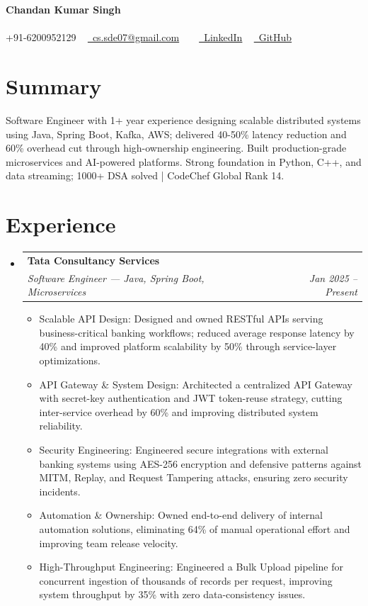 \documentclass[10pt, letterpaper]{article}
\makeatletter
\newcommand{\resumeItem}[1]{
  \item\small{
    {#1 \vspace{-2pt}}
  }
}
\newcommand{\resumeSubheading}[4]{
  \vspace{-2pt}\item
    \begin{tabular*}{1.0\textwidth}[t]{l@{\extracolsep{\fill}}r}
      \textbf{#1} & \textbf{\small #2} \\
      \textit{\small#3} & \textit{\small #4} \\
    \end{tabular*}\vspace{-7pt}
}
\newcommand{\resumeSubHeadingListStart}{\begin{itemize}[leftmargin=0.0in, label={}]}
\newcommand{\resumeSubHeadingListEnd}{\end{itemize}}
\newcommand{\resumeItemListStart}{\begin{itemize}[leftmargin=0.15in]}
\newcommand{\resumeItemListEnd}{\end{itemize}\vspace{-5pt}}
\makeatother
\begin{document}
\begin{center}
    {\Huge \bfseries Chandan Kumar Singh} \\ \vspace{5pt}
    ~ \\ \vspace{5pt}
    \small \faPhone* +91-6200952129 ~ 
    \href{mailto:cs.sde07@gmail.com}{\faEnvelope~cs.sde07@gmail.com} ~ 
     ~ \href{LinkedIn}{\faLinkedin~LinkedIn}
     ~ \href{GitHub}{\faGithub~GitHub}
    
\end{center}

\section{Summary}
Software Engineer with 1+ year experience designing scalable distributed systems using Java, Spring Boot, Kafka, AWS; delivered 40-50\% latency reduction and 60\% overhead cut through high-ownership engineering. Built production-grade microservices and AI-powered platforms. Strong foundation in Python, C++, and data streaming; 1000+ DSA solved | CodeChef Global Rank 14.


\section{Experience}
\resumeSubHeadingListStart
  \resumeSubheading{Tata Consultancy Services}{}{Software Engineer — Java, Spring Boot, Microservices}{Jan 2025 -- Present}
    \resumeItemListStart
      \resumeItem{Scalable API Design: Designed and owned RESTful APIs serving business-critical banking workflows; reduced average response latency by 40\% and improved platform scalability by 50\% through service-layer optimizations.}
      \resumeItem{API Gateway \& System Design: Architected a centralized API Gateway with secret-key authentication and JWT token-reuse strategy, cutting inter-service overhead by 60\% and improving distributed system reliability.}
      \resumeItem{Security Engineering: Engineered secure integrations with external banking systems using AES-256 encryption and defensive patterns against MITM, Replay, and Request Tampering attacks, ensuring zero security incidents.}
      \resumeItem{Automation \& Ownership: Owned end-to-end delivery of internal automation solutions, eliminating 64\% of manual operational effort and improving team release velocity.}
      \resumeItem{High-Throughput Engineering: Engineered a Bulk Upload pipeline for concurrent ingestion of thousands of records per request, improving system throughput by 35\% with zero data-consistency issues.}
    \resumeItemListEnd
\resumeSubHeadingListEnd
\end{document}
